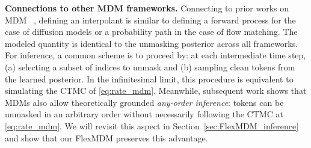 \textbf{Connections to other MDM frameworks.} Connecting to prior works on MDM ~\citep{shi2024simplified, sahoo2024simple, campbell2022continuous}, defining an interpolant is similar to defining a forward process for the case of diffusion models or a probability path in the case of flow matching. The modeled quantity is identical to the unmasking posterior across all frameworks. For inference, a common scheme is to proceed by: at each intermediate time step, (a) selecting a subset of indices to unmask and (b) sampling clean tokens from the learned posterior. In the infinitesimal limit, this procedure is equivalent to simulating the CTMC of \eqref{eq:rate_mdm}. Meanwhile, subsequent work \cite{kim2025train,nie2025large} shows that MDMs also allow theoretically grounded \emph{any-order inference}: tokens can be unmasked in an arbitrary order without necessarily following the CTMC at \eqref{eq:rate_mdm}. We will revisit this aspect in Section~\ref{sec:FlexMDM_inference} and show that our FlexMDM preserves this advantage.